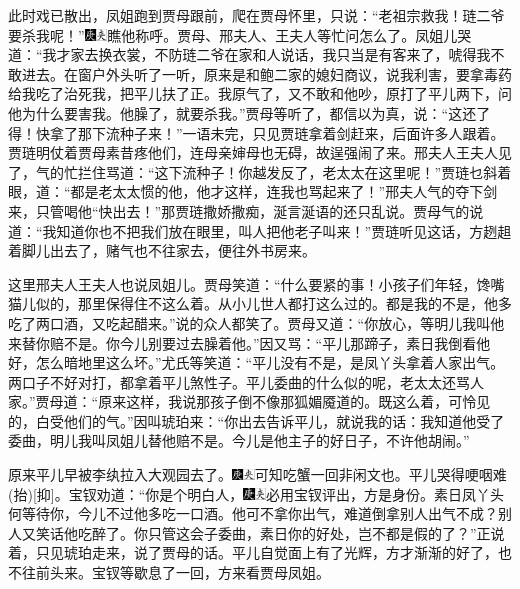 此时戏已散出，凤姐跑到贾母跟前，爬在贾母怀里，只说：“老祖宗救我！琏二爷要杀我呢！”{\includegraphics[width=3mm]{../Images/00004}\includegraphics[width=3mm]{../Images/00012}\footnotesize \kaishu 瞧他称呼。}贾母、邢夫人、王夫人等忙问怎么了。凤姐儿哭道：“我才家去换衣裳，不防琏二爷在家和人说话，我只当是有客来了，唬得我不敢进去。在窗户外头听了一听，原来是和鲍二家的媳妇商议，说我利害，要拿毒药给我吃了治死我，把平儿扶了正。我原气了，又不敢和他吵，原打了平儿两下，问他为什么要害我。他臊了，就要杀我。”贾母等听了，都信以为真，说：“这还了得！快拿了那下流种子来！”一语未完，只见贾琏拿着剑赶来，后面许多人跟着。贾琏明仗着贾母素昔疼他们，连母亲婶母也无碍，故逞强闹了来。邢夫人王夫人见了，气的忙拦住骂道：“这下流种子！你越发反了，老太太在这里呢！”贾琏乜斜着眼，道：“都是老太太惯的他，他才这样，连我也骂起来了！”邢夫人气的夺下剑来，只管喝他“快出去！”那贾琏撒娇撒痴，涎言涎语的还只乱说。贾母气的说道：“我知道你也不把我们放在眼里，叫人把他老子叫来！”贾琏听见这话，方趔趄着脚儿出去了，赌气也不往家去，便往外书房来。

这里邢夫人王夫人也说凤姐儿。贾母笑道：“什么要紧的事！小孩子们年轻，馋嘴猫儿似的，那里保得住不这么着。从小儿世人都打这么过的。都是我的不是，他多吃了两口酒，又吃起醋来。”说的众人都笑了。贾母又道：“你放心，等明儿我叫他来替你赔不是。你今儿别要过去臊着他。”因又骂：“平儿那蹄子，素日我倒看他好，怎么暗地里这么坏。”尤氏等笑道：“平儿没有不是，是凤丫头拿着人家出气。两口子不好对打，都拿着平儿煞性子。平儿委曲的什么似的呢，老太太还骂人家。”贾母道：“原来这样，我说那孩子倒不像那狐媚魇道的。既这么着，可怜见的，白受他们的气。”因叫琥珀来：“你出去告诉平儿，就说我的话：我知道他受了委曲，明儿我叫凤姐儿替他赔不是。今儿是他主子的好日子，不许他胡闹。”

原来平儿早被李纨拉入大观园去了。{\includegraphics[width=3mm]{../Images/00004}\includegraphics[width=3mm]{../Images/00012}\footnotesize \kaishu 可知吃蟹一回非闲文也。}平儿哭得哽咽难{(抬)}{[}抑{]}。宝钗劝道：“你是个明白人，{\includegraphics[width=3mm]{../Images/00004}\includegraphics[width=3mm]{../Images/00012}\footnotesize \kaishu 必用宝钗评出，方是身份。}素日凤丫头何等待你，今儿不过他多吃一口酒。他可不拿你出气，难道倒拿别人出气不成？别人又笑话他吃醉了。你只管这会子委曲，素日你的好处，岂不都是假的了？”正说着，只见琥珀走来，说了贾母的话。平儿自觉面上有了光辉，方才渐渐的好了，也不往前头来。宝钗等歇息了一回，方来看贾母凤姐。


